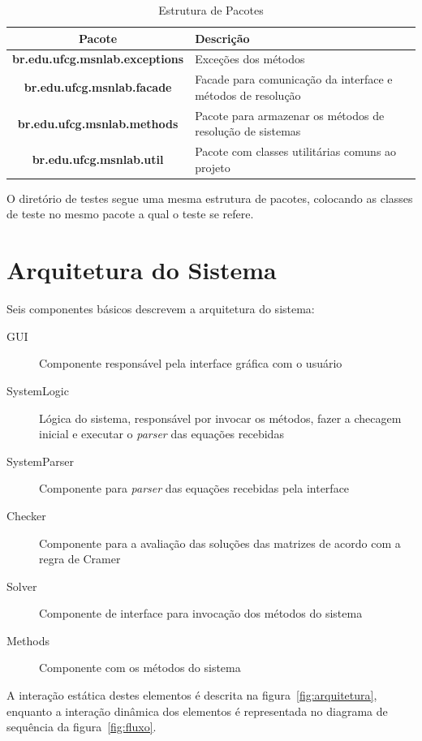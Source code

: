 \documentclass[a4paper,10pt]{report}
\begin{document}
\begin{table}[h]
\centering
\caption{Estrutura de Pacotes}
        \begin{tabular}{|c|p{2in}|}
        \hline
        \textbf{Pacote} & \textbf{Descrição} \\ \hline
        \textbf{br.edu.ufcg.msnlab.exceptions} & Exceções dos métodos \\ \hline
        \textbf{br.edu.ufcg.msnlab.facade} & Facade para comunicação da interface e métodos de resolução \\ \hline
        \textbf{br.edu.ufcg.msnlab.methods} & Pacote para armazenar os métodos de resolução de sistemas \\ \hline
        \textbf{br.edu.ufcg.msnlab.util} & Pacote com classes utilitárias comuns ao projeto \\ \hline
        \end{tabular}
\label{tab:pacotes}
\end{table} 

O diretório de testes segue uma mesma estrutura de pacotes, colocando as classes de teste no mesmo pacote a qual o teste se refere.

\section{Arquitetura do Sistema}

Seis componentes básicos descrevem a arquitetura do sistema:
\begin{description}
 \item[GUI] Componente responsável pela interface gráfica com o usuário
 \item[SystemLogic] Lógica do sistema, responsável por invocar os métodos, fazer a checagem inicial e executar o \textit{parser} das equações recebidas
 \item[SystemParser] Componente para \textit{parser} das equações recebidas pela interface
 \item[Checker] Componente para a avaliação das soluções das matrizes de acordo com a regra de Cramer
 \item[Solver] Componente de interface para invocação dos métodos do sistema
 \item[Methods] Componente com os métodos do sistema
 \end{description}

A interação estática destes elementos é descrita na figura~\ref{fig:arquitetura}, enquanto a interação dinâmica dos elementos é representada no diagrama de sequência da figura~\ref{fig:fluxo}.
\end{document}
